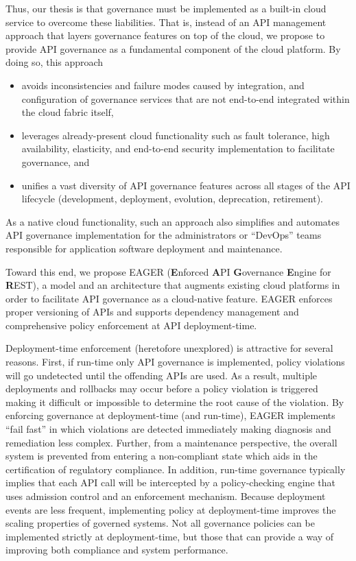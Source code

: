 Thus, our thesis is that governance must be implemented as a built-in cloud service to
overcome these liabilities.
That is, instead of an API management
approach that layers governance features on top of the cloud, 
we propose to provide API governance as a fundamental component of the cloud
platform.  By doing so, this approach
\begin{itemize}
\item avoids inconsistencies and failure modes caused  
by integration, and configuration of governance services that are not
end-to-end integrated within the cloud fabric itself, 
\item leverages already-present cloud functionality such as fault tolerance,
high availability, elasticity, and end-to-end security implementation to
facilitate governance, and
\item unifies a vast diversity of API
governance features across all stages of the API lifecycle
(development, deployment, evolution, deprecation, retirement). 
\end{itemize}
As a native cloud functionality, such an
approach also simplifies and automates API governance implementation for
the administrators or ``DevOps'' teams responsible for application
software deployment and
maintenance.

Toward this end, we propose EAGER ({\bf E}nforced {\bf A}PI {\bf G}overnance
{\bf E}ngine for {\bf R}EST), a model and an architecture that augments existing
cloud platforms in order to facilitate API governance as a 
cloud-native feature. EAGER enforces proper versioning of APIs and supports dependency 
management and comprehensive policy enforcement at API deployment-time. 

Deployment-time enforcement (heretofore unexplored) is attractive for several
reasons.  First, if run-time only API governance is implemented, 
policy violations will go undetected until the offending APIs are used.  
As a result, multiple deployments and rollbacks may occur before a policy
violation is triggered making it difficult or impossible to determine the root
cause of the violation.  By enforcing governance at deployment-time (and
run-time),
EAGER implements ``fail fast'' in which violations are detected
immediately making diagnosis and remediation less complex.  
Further, from a maintenance perspective,  the overall
system is prevented from entering a non-compliant state which aids in the
certification of regulatory compliance.  In addition, run-time governance
typically implies that each API call will be intercepted by a policy-checking engine
that uses admission control and an enforcement mechanism.  Because deployment
events are less frequent, implementing policy at deployment-time improves the
scaling properties of governed systems.   Not all governance policies can be
implemented strictly at deployment-time, but those that can provide a way
of improving both compliance and system performance.

